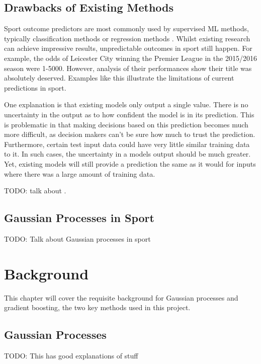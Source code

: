 \documentclass[12pt,a4paper]{report}
\theoremstyle{definition}
\begin{document}
\section{Drawbacks of Existing Methods}

Sport outcome predictors are most commonly used by supervised ML methods, typically classification methods or regression methods \citep{horvat2020}. 
Whilst existing research can achieve impressive results, unpredictable outcomes in sport still happen. For example, the odds of Leicester City winning the Premier League in the 2015/2016 season were 1-5000. 
However, analysis of their performances show their title was absolutely deserved.
Examples like this illustrate the limitations of current predictions in sport.

One explanation is that existing models only output a single value. 
There is no uncertainty in the output as to how confident the model is in its prediction. 
This is problematic in that making decisions based on this prediction becomes much more difficult, as decision makers can't be sure how much to trust the prediction. 
Furthermore, certain test input data could have very little similar training data to it. 
In such cases, the uncertainty in a models output should be much greater. 
Yet, existing models will still provide a prediction the same as it would for inputs where there was a large amount of training data.

 TODO: talk about \citep{Blumberg2020}.

\section{Gaussian Processes in Sport}

TODO: Talk about Gaussian processes in sport

\chapter{Background}

This chapter will cover the requisite background for Gaussian processes and gradient boosting, the two key methods used in this project.

\section{Gaussian Processes}

\citep{Yi2019} TODO: This has good explanations of stuff
\end{document}
